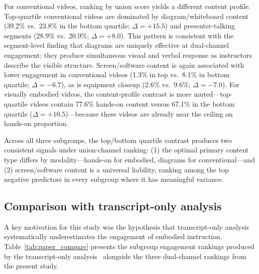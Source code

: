\documentclass[fleqn,10pt]{wlscirep}
\begin{document}
For conventional videos, ranking by union score yields a different content profile. Top-quartile conventional videos are dominated by diagram/whiteboard content (39.2\% vs.\ 23.8\% in the bottom quartile; $\Delta = +15.5$) and presenter-talking segments (28.9\% vs.\ 20.9\%; $\Delta = +8.0$). This pattern is consistent with the segment-level finding that diagrams are uniquely effective at dual-channel engagement: they produce simultaneous visual and verbal response as instructors describe the visible structure. Screen/software content is again associated with lower engagement in conventional videos (1.3\% in top vs.\ 8.1\% in bottom quartile; $\Delta = -6.7$), as is equipment closeup (2.6\% vs.\ 9.6\%; $\Delta = -7.0$). For visually embodied videos, the content-profile contrast is more muted---top-quartile videos contain 77.6\% hands-on content versus 67.1\% in the bottom quartile ($\Delta = +10.5$)---because these videos are already near the ceiling on hands-on proportion.

Across all three subgroups, the top/bottom quartile contrast produces two consistent signals under union-channel ranking: (1) the optimal primary content type differs by modality---hands-on for embodied, diagrams for conventional---and (2) screen/software content is a universal liability, ranking among the top negative predictors in every subgroup where it has meaningful variance.


\subsection*{Comparison with transcript-only analysis}

A key motivation for this study was the hypothesis that transcript-only analysis systematically underestimates the engagement of embodied instruction. Table~\ref{tab:paper_compare} presents the subgroup engagement rankings produced by the transcript-only analysis~\cite{zhang2025transcript} alongside the three dual-channel rankings from the present study.
\end{document}
